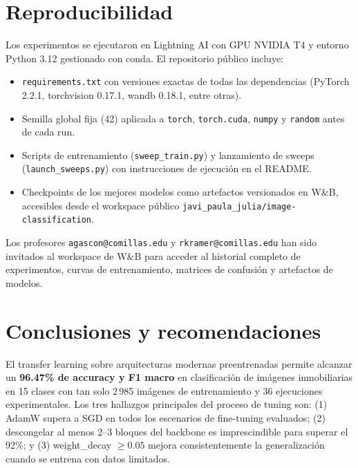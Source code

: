 \documentclass[11pt,a4paper]{article}
\begin{document}
\section{Reproducibilidad}

Los experimentos se ejecutaron en Lightning AI con GPU NVIDIA T4 y entorno Python 3.12 gestionado con conda. El repositorio público incluye:

\begin{itemize}\setlength\itemsep{2pt}
    \item \texttt{requirements.txt} con versiones exactas de todas las dependencias (PyTorch 2.2.1, torchvision 0.17.1, wandb 0.18.1, entre otras).
    \item Semilla global fija (42) aplicada a \texttt{torch}, \texttt{torch.cuda}, \texttt{numpy} y \texttt{random} antes de cada run.
    \item Scripts de entrenamiento (\texttt{sweep\_train.py}) y lanzamiento de sweeps (\texttt{launch\_sweeps.py}) con instrucciones de ejecución en el README.
    \item Checkpoints de los mejores modelos como artefactos versionados en W\&B, accesibles desde el workspace público \texttt{javi\_paula\_julia/image-classification}.
\end{itemize}

Los profesores \texttt{agascon@comillas.edu} y \texttt{rkramer@comillas.edu} han sido invitados al workspace de W\&B para acceder al historial completo de experimentos, curvas de entrenamiento, matrices de confusión y artefactos de modelos.

\section{Conclusiones y recomendaciones}

El transfer learning sobre arquitecturas modernas preentrenadas permite alcanzar un \textbf{96.47\% de accuracy y F1 macro} en clasificación de imágenes inmobiliarias en 15 clases con tan solo 2\,985 imágenes de entrenamiento y 36 ejecuciones experimentales. Los tres hallazgos principales del proceso de tuning son: (1) AdamW supera a SGD en todos los escenarios de fine-tuning evaluados; (2) descongelar al menos 2--3 bloques del backbone es imprescindible para superar el 92\%; y (3) weight\_decay $\geq 0.05$ mejora consistentemente la generalización cuando se entrena con datos limitados.
\end{document}
